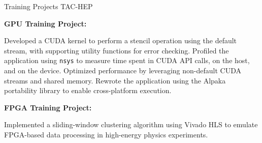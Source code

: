 

\begin{cventries}

  \cventry
    {Training Projects} %
    {TAC-HEP} %
    {} %
    {} %
    {
      \begin{cvitems} %
        \item {\textbf{GPU Training Project:}} \\
        \begin{cvitems}
          \item {Developed a CUDA kernel to perform a stencil operation using the default stream, with supporting utility functions for error checking. Profiled the application using \texttt{nsys} to measure time spent in CUDA API calls, on the host, and on the device. Optimized performance by leveraging non-default CUDA streams and shared memory. Rewrote the application using the Alpaka portability library to enable cross-platform execution.}        
        \end{cvitems}
        \item {\textbf{FPGA Training Project:}} \\
        \begin{cvitems}
          \item {Implemented a sliding-window clustering algorithm using Vivado HLS to emulate FPGA-based data processing in high-energy physics experiments.}        \end{cvitems}
      \end{cvitems}
    }

\end{cventries}